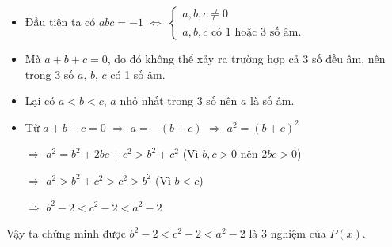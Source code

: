 \begin{itemize}
    \item Đầu tiên ta có $abc = -1$ $\Leftrightarrow$
    $\begin{cases}
        a, b, c \neq 0\\
        a, b, c \text{ có 1 hoặc 3 số âm.}
    \end{cases}$
    \item Mà $a + b + c = 0$, do đó không thể xảy ra trường hợp cả 3 số đều âm, nên trong 3 số $a$, $b$, $c$ có 1 số âm.
    \item Lại có $a < b < c$, $a$ nhỏ nhất trong 3 số nên $a$ là số âm.
    \item Từ $a + b + c = 0$ $\Rightarrow$ $a = -(b + c)$ $\Rightarrow$ $a^2 = (b + c)^2$
    
    $\Rightarrow$ $a^2 = b^2 + 2bc + c^2 > b^2 + c^2$ (Vì $b, c > 0$ nên $2bc > 0$)
    
    $\Rightarrow$ $a^2 > b^2 + c^2 > c^2 > b^2$ (Vì $b < c$)
    
    $\Rightarrow$ $b^2 - 2 < c^2 - 2 < a^2 - 2$
\end{itemize}
Vậy ta chứng minh được $b^2 - 2 < c^2 - 2 < a^2 - 2$ là 3 nghiệm của $P(x)$.

\clearpage